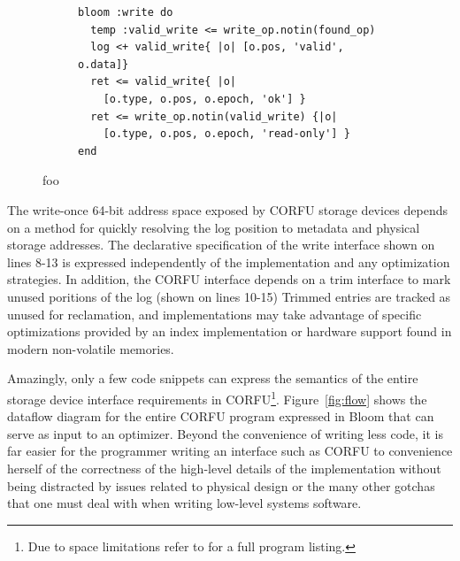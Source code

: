 \begin{figure}[t]
\begin{subfigure}{0.9\columnwidth}
\begin{lstlisting}[title={{\bf (c)}}, label=lst:write]
bloom :write do
  temp :valid_write <= write_op.notin(found_op)
  log <+ valid_write{ |o| [o.pos, 'valid', o.data]}
  ret <= valid_write{ |o|
    [o.type, o.pos, o.epoch, 'ok'] }
  ret <= write_op.notin(valid_write) {|o|
    [o.type, o.pos, o.epoch, 'read-only'] }
end
\end{lstlisting}
\end{subfigure}
\caption{foo}
\end{figure}


The write-once 64-bit address space exposed by CORFU storage devices depends on
a method for quickly resolving the log position to metadata and physical
storage addresses. The declarative specification of the write interface shown
on lines 8-13 is expressed independently of the implementation and any
optimization strategies.  In addition, the CORFU interface depends on a trim
interface to mark unused poritions of the log (shown on lines 10-15) Trimmed
entries are tracked as unused for reclamation, and implementations may take
advantage of specific optimizations provided by an index implementation or
hardware support found in modern non-volatile memories.


Amazingly, only a few code snippets can express the semantics of the entire
storage device interface requirements in CORFU\footnote{Due to space
limitations refer to \cite{watkins:ucsc-soe-16-12} for a full program
listing.}.  Figure~\ref{fig:flow} shows the dataflow diagram for the entire
CORFU program expressed in Bloom that can serve as input to an optimizer.
Beyond the convenience of writing less code, it is far easier for the
programmer writing an interface such as CORFU to convenience herself of the
correctness of the high-level details of the implementation without being
distracted by issues related to physical design or the many other gotchas that
one must deal with when writing low-level systems software.

